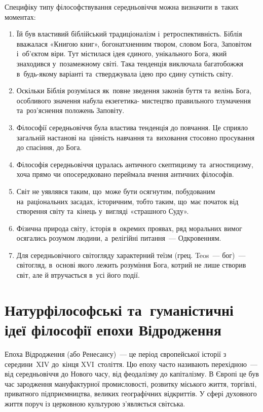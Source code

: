 \documentclass[a5paper,oneside,DIV=12,12pt,headings=small]{scrartcl}
\begin{document}
		Специфіку типу філософствування середньовіччя можна визначити в~таких моментах:
		\begin{enumerate}
			\item Їй був властивий біблійський традиціоналізм і~ретроспективність. Біблія вважалася «Книгою книг», богонатхненним твором, словом Бога, Заповітом і~об'єктом віри. Тут містилася ідея єдиного, унікального Бога, який знаходився у~позамежному світі. Така тенденція виключала багатобожжя в~будь-якому варіанті та~стверджувала ідею про єдину сутність світу.
			\item Оскільки Біблія розумілася як~повне зведення законів буття та~велінь Бога, особливого значення набула екзегетика- мистецтво правильного тлумачення та~роз'яснення положень Заповіту.
			\item Філософії середньовіччя була властива тенденція до повчання. Це сприяло загальній настанові на~цінність навчання та~виховання стосовно просування до спасіння, до Бога.
			\item Філософія середньовіччя цуралась античного скептицизму та~агностицизму, хоча прямо чи опосередковано переймала вчення античних філософів.
			\item Світ не уявлявся таким, що~може бути осягнутим, побудованим на~раціональних засадах, історичним, тобто таким, що~має початок від створення світу та~кінець у~вигляді «страшного Суду».
			\item Фізична природа світу, історія в~окремих проявах, ряд моральних вимог осягались розумом людини, а~релігійні питання~— Одкровенням.
			\item Для середньовічного світогляду характерний теїзм (грец. Teos~— бог)~— світогляд, в~основі якого лежить розуміння Бога, котрий не лише створив світ, але й втручається в~усі його події.
		\end{enumerate}
		
	\section{Натурфілософські та~гуманістичні ідеї філософії епохи Відродження}
		Епоха Відродження (або Ренесансу)~— це період європейської історії з середини~XIV до~кінця XVI~століття. Цю епоху часто називають перехідною~— від середньовіччя до Нового часу, від феодалізму до капіталізму. В Європі це був час зародження мануфактурної промисловості, розвитку міського життя, торгівлі, приватного підприємництва, великих географічних відкриттів. У сфері духовного життя поруч із церковною культурою з'являється світська.
\end{document}
